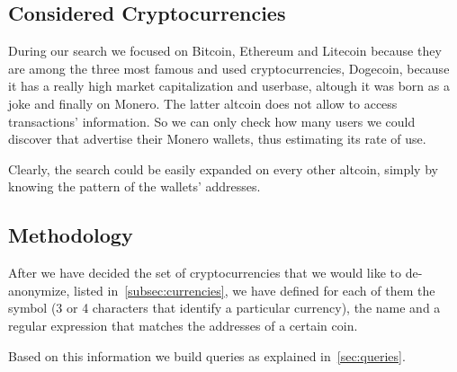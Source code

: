 \subsection{Considered Cryptocurrencies}
\label{subsec:currencies}
During our search we focused on 
Bitcoin, Ethereum and Litecoin because they are among the three most
famous and used cryptocurrencies, Dogecoin, because it has a really
high market capitalization and userbase, altough it was born as a joke and
finally on Monero.
The latter altcoin does not allow to access transactions' 
information. So we can only check how many users we could discover
that advertise their Monero wallets, thus estimating its rate of use.

Clearly, the search could be easily expanded on every
other altcoin, simply by knowing the pattern of the wallets' addresses.


\subsection{Methodology}
\label{sec:methodology}
After we have decided the set of cryptocurrencies that we would like to
de-anonymize, listed in~\autoref{subsec:currencies}, we have defined for
each of them the symbol (3 or 4 characters that identify a particular
currency), the name and a regular expression that matches the addresses of a
certain coin.

Based on this information we build queries as explained
in~\autoref{sec:queries}.

